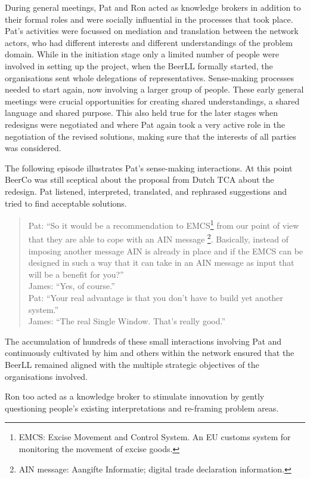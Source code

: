 \documentclass[graybox]{styles/svmult}
\begin{document}
During general meetings, Pat and Ron acted as knowledge brokers in addition to their formal roles and were socially influential in the processes that took place. Pat's activities were focussed on mediation and translation between the network actors, who had different interests and different understandings of the problem domain. While in the initiation stage only a limited number of people were involved in setting up the project, when the BeerLL formally started, the organisations sent whole delegations of representatives. Sense-making processes needed to start again, now involving a larger group of people. These early general meetings were crucial opportunities for creating shared understandings, a shared language and shared purpose. This also held true for the later stages when redesigns were negotiated and where Pat again took a very active role in the negotiation of the revised solutions, making sure that the interests of all parties was considered. 

The following episode illustrates Pat's sense-making interactions. At this point BeerCo was still sceptical about the proposal from Dutch TCA about the redesign. Pat listened, interpreted, translated, and rephrased suggestions and tried to find acceptable solutions. 

\blockquote{
Pat: \enquote{So it would be a recommendation to EMCS\footnote{EMCS: Excise Movement and Control System. An EU customs system for monitoring the movement of excise goods.} from our point of view that they are able to cope with an AIN message \footnote{AIN message: Aangifte Informatie; digital trade declaration information.}. Basically, instead of imposing another message AIN is already in place and if the EMCS can be designed in such a way that it can take in an AIN message as input that will be a benefit for you?} \\
James: \enquote{Yes, of course.} \\
Pat:  \enquote{Your real advantage is that you don't have to build yet another system.} \\
James: \enquote{The real Single Window. That's really good.}
}
The accumulation of hundreds of these small interactions involving Pat and continuously cultivated by him and others within the network ensured that the BeerLL remained aligned with the multiple strategic objectives of the organisations involved. 

Ron too acted as a knowledge broker to stimulate innovation by gently questioning people's existing interpretations and re-framing problem areas. 
\end{document}
